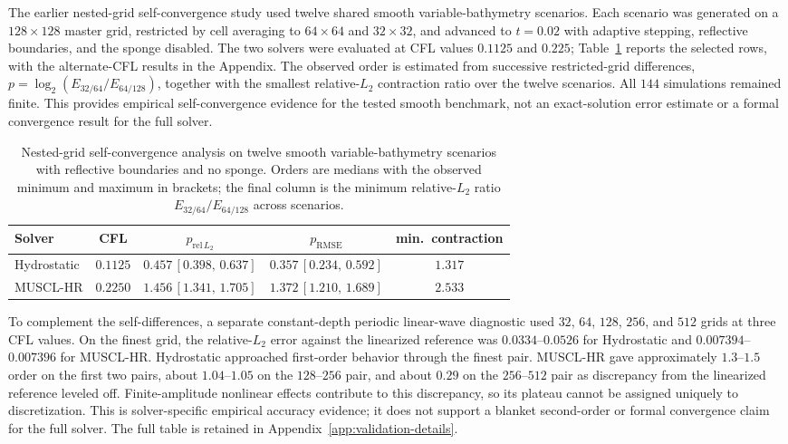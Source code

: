 The earlier nested-grid self-convergence study used twelve shared smooth variable-bathymetry scenarios. Each scenario was generated on a $128 \times 128$ master grid, restricted by cell averaging to $64 \times 64$ and $32 \times 32$, and advanced to $t = 0.02$ with adaptive stepping, reflective boundaries, and the sponge disabled. The two solvers were evaluated at CFL values $0.1125$ and $0.225$; Table~\ref{tab:self-convergence} reports the selected rows, with the alternate-CFL results in the Appendix. The observed order is estimated from successive restricted-grid differences, $p = \log_2(E_{32/64}/E_{64/128})$, together with the smallest relative-$L_2$ contraction ratio over the twelve scenarios. All $144$ simulations remained finite. This provides empirical self-convergence evidence for the tested smooth benchmark, not an exact-solution error estimate or a formal convergence result for the full solver.

\begin{table}[pos=!htbp]
\centering
\caption{Nested-grid self-convergence analysis on twelve smooth variable-bathymetry scenarios with reflective boundaries and no sponge. Orders are medians with the observed minimum and maximum in brackets; the final column is the minimum relative-$L_2$ ratio $E_{32/64}/E_{64/128}$ across scenarios.}
\label{tab:self-convergence}
\small
\begin{tabular}{lcccc}
    \toprule
    Solver & CFL & $p_{\mathrm{rel}\,L_2}$ & $p_{\mathrm{RMSE}}$ & min.\ contraction \\
    \midrule
    Hydrostatic & $0.1125$ & $0.457\,[0.398,\,0.637]$ & $0.357\,[0.234,\,0.592]$ & $1.317$ \\
    MUSCL-HR    & $0.2250$ & $1.456\,[1.341,\,1.705]$ & $1.372\,[1.210,\,1.689]$ & $2.533$ \\
    \bottomrule
\end{tabular}
\end{table}

To complement the self-differences, a separate constant-depth periodic linear-wave diagnostic used $32$, $64$, $128$, $256$, and $512$ grids at three CFL values. On the finest grid, the relative-$L_2$ error against the linearized reference was $0.0334$--$0.0526$ for Hydrostatic and $0.007394$--$0.007396$ for MUSCL-HR. Hydrostatic approached first-order behavior through the finest pair. MUSCL-HR gave approximately $1.3$--$1.5$ order on the first two pairs, about $1.04$--$1.05$ on the $128$--$256$ pair, and about $0.29$ on the $256$--$512$ pair as discrepancy from the linearized reference leveled off. Finite-amplitude nonlinear effects contribute to this discrepancy, so its plateau cannot be assigned uniquely to discretization. This is solver-specific empirical accuracy evidence; it does not support a blanket second-order or formal convergence claim for the full solver. The full table is retained in Appendix~\ref{app:validation-details}.

